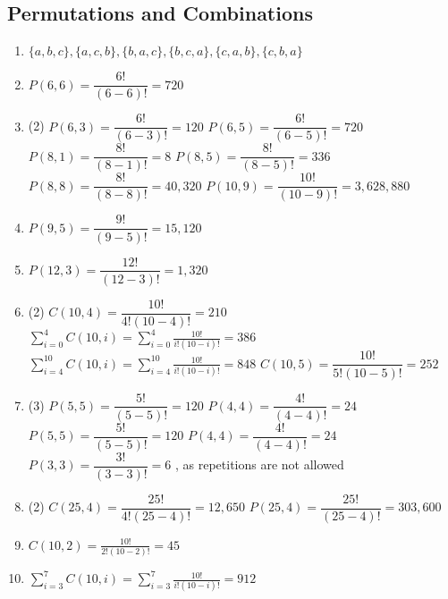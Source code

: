 \documentclass[12pt, A4]{article}
\begin{document}
		\subsection{Permutations and Combinations}
			\begin{enumerate}
				\item
					\(\{a, b, c\}, \{a, c, b\}, \{b, a, c\}, \{b, c, a\}, \{c, a, b\}, \{c, b, a\}\)
				\setcounter{enumi}{2}
				\item
					\(P(6, 6) = \dfrac{6!}{(6 - 6)!} = 720\)
				\setcounter{enumi}{4}
				\item
					\begin{tasks}(2)
						\task
							\(P(6, 3) = \dfrac{6!}{(6 - 3)!} = 120\)
						\task
							\(P(6, 5) = \dfrac{6!}{(6 - 5)!} = 720\)
						\task
							\(P(8, 1) = \dfrac{8!}{(8 - 1)!} = 8\)
						\task
							\(P(8, 5) = \dfrac{8!}{(8 - 5)!} = 336\)
						\task
							\(P(8, 8) = \dfrac{8!}{(8 - 8)!} = 40,320\)
						\task
							\(P(10, 9) = \dfrac{10!}{(10 - 9)!} = 3,628,880\) 
					\end{tasks}
				\setcounter{enumi}{6}
				\item
					\(P(9, 5) = \dfrac{9!}{(9 - 5)!} = 15,120\)
				\setcounter{enumi}{8}
				\item
					\(P(12, 3) = \dfrac{12!}{(12 - 3)!} = 1,320\)
				\setcounter{enumi}{10}
				\item
					\begin{tasks}(2)
						\task
							\(C(10, 4) = \dfrac{10!}{4!(10 - 4)!} = 210\)
						\task
							\(\displaystyle \sum_{i = 0}^4 C(10, i) = \sum_{i = 0}^4 \frac{10!}{i!(10 - i)!} = 386\)
						\task
							\(\displaystyle \sum_{i = 4}^{10} C(10, i) = \sum_{i = 4}^{10} \frac{10!}{i!(10 - i)!} = 848\)
						\task
							\(C(10, 5) = \dfrac{10!}{5!(10 - 5)!} = 252\)
					\end{tasks}
				\setcounter{enumi}{20}
				\item
					\begin{tasks}(3)
						\task
							\(P(5, 5) = \dfrac{5!}{(5 - 5)!} = 120\)	
						\task
							\(P(4, 4) = \dfrac{4!}{(4 - 4)!} = 24\)
						\task
							\(P(5, 5) = \dfrac{5!}{(5 - 5)!} = 120\)
						\task
							\(P(4, 4) = \dfrac{4!}{(4 - 4)!} = 24\)
						\task
							\(P(3, 3) = \dfrac{3!}{(3 - 3)!} = 6\)
						, as repetitions are not allowed
					\end{tasks}
				\setcounter{enumi}{28}
				\item
					\begin{tasks}(2)
						\task
							\(C(25, 4) = \dfrac{25!}{4!(25 - 4)!} = 12,650\)
						\task
							\(P(25, 4) = \dfrac{25!}{(25 - 4)!} = 303,600\)
					\end{tasks}
				\setcounter{enumi}{36}
				\item
					\(C(10, 2) = \frac{10!}{2!(10 - 2)!} = 45\)
				\setcounter{enumi}{38}
				\item
					\(\displaystyle \sum_{i = 3}^{7}C(10, i) = \sum_{i = 3}^7 \frac{10!}{i!(10 - i)!} = 912\)
			\end{enumerate}
		\setcounter{subsection}{3}
\end{document}
